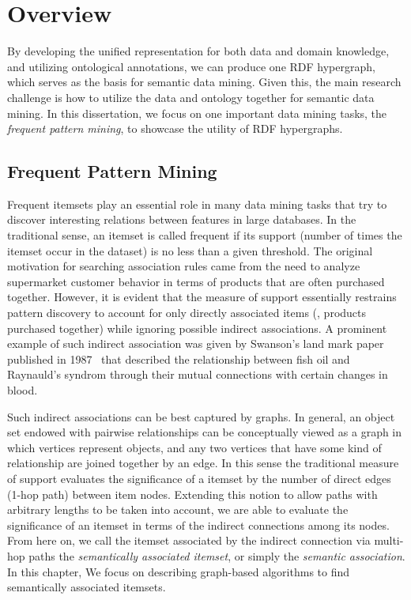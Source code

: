 \section{Overview}
By developing the unified representation for both data and domain knowledge, and utilizing ontological annotations, we can produce one RDF hypergraph, which serves as the basis for semantic data mining. Given this, the main research challenge is how to utilize the data and ontology together for semantic data mining. In this dissertation, we focus on one important data mining tasks, the {\em frequent pattern mining}, to showcase the utility of RDF hypergraphs.

\subsection{Frequent Pattern Mining}
\label{sec:association}
Frequent itemsets play an essential role in many data mining tasks that try to discover interesting relations between features in large databases. In the traditional sense, an itemset is called frequent if its support (number of times the itemset occur in the dataset) is no less than a given threshold. The original motivation for searching association rules came from the need to analyze supermarket customer behavior in terms of products that are often purchased together. However, it is evident that the measure of support essentially restrains pattern discovery to account for only directly associated items (\eg, products purchased together) while ignoring possible indirect associations. A prominent example of such indirect association was given by Swanson's land mark paper published in 1987~\cite{swanson87} that described the relationship between fish oil and Raynauld's syndrom through their mutual connections with certain changes in blood.


Such indirect associations can be best captured by graphs. In general, an object set endowed with pairwise relationships can be conceptually viewed as a graph in which vertices represent objects, and any two vertices that have some kind of relationship are joined together by an edge. In this sense the traditional measure of support evaluates the significance of a itemset by the number of direct edges (1-hop path) between item nodes. Extending this notion to allow paths with arbitrary lengths to be taken into account, we are able to evaluate the significance of an itemset in terms of the indirect connections among its nodes. From here on, we call the itemset associated by the indirect connection via multi-hop paths the \emph{semantically associated itemset}, or simply the \emph{semantic association}. In this chapter, We focus on describing graph-based algorithms to find semantically associated itemsets.

